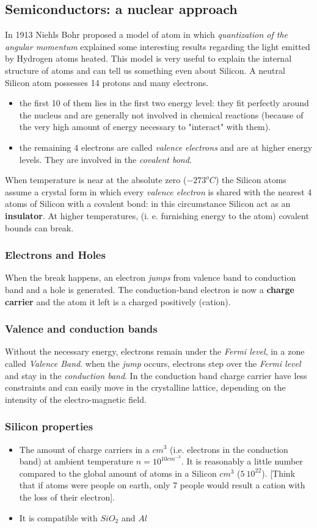 \documentclass[12pt]{article}
\newcommand{\B}{\textbf}
\newcommand{\I}{\textit}
\newcommand{\bite}{\begin{itemize}} %
\newcommand{\fite}{\end{itemize}}   %
\begin{document}
\subsection{Semiconductors: a nuclear approach}
In 1913 Niehls Bohr  proposed a model of atom in which \I{quantization of the angular momentum}  explained some interesting results regarding the light emitted by Hydrogen atoms heated. This model is very useful to explain the internal structure of atoms and can tell us something even about Silicon. A neutral Silicon atom possesses 14 protons and many electrons.
\begin{itemize}
	\item the first 10 of them lies in the first two energy level: they fit perfectly around the nucleus and  are generally not involved in chemical reactions (because of the very high amount of energy necessary to "interact" with them).
	\item the remaining 4 electrons are called \textit{valence electrons} and are at higher energy levels. They are involved in the \textit{covalent bond}.
\end{itemize}
When temperature is near at the absolute zero ($-273^o C$) the Silicon atoms assume a crystal form in which every \textit{valence electron} is shared with the nearest 4 atoms of Silicon with a covalent bond: in this circumstance Silicon act as an \textbf{insulator}.
At higher temperatures, (i. e. furnishing energy to the atom) covalent bounds can break. 
\subsubsection{Electrons and Holes}
When the break happens, an electron \I{jumps} from valence band to conduction band and a hole is generated. The conduction-band electron is now a \B{charge carrier} and the atom it left is a charged positively (cation). 
\subsubsection{Valence and conduction bands}
Without the necessary energy, electrons remain under the \I{Fermi level}, in a zone called \I{Valence Band}. when the \I{jump} occurs, electrons step over the \I{Fermi level} and stay in the \I{conduction band}. In the conduction band charge carrier have less constraints and can easily move in the crystalline lattice, depending on the intensity of the electro-magnetic field.
\subsubsection{Silicon properties}
\bite
	\item The amount of charge carriers in a $cm^3$ (i.e. electrons in the conduction band) at ambient temperature $n = 10^{10 cm^{-3}}$. It is reasonably a little number compared to the global amount of atoms in a Silicon $cm^3$ ($5 \ 10^22$). [Think that if atoms were people on earth, only 7 people would result a cation with the loss of their electron]. 
	\item It is compatible with $SiO_2$ and $Al$
\fite
\end{document}
